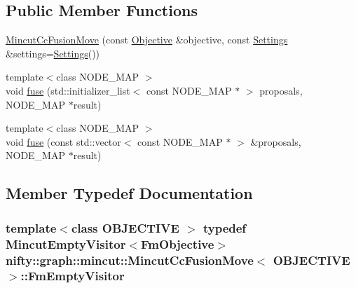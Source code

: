 \subsection*{Public Member Functions}
\begin{DoxyCompactItemize}
\item 
\hyperlink{classnifty_1_1graph_1_1mincut_1_1MincutCcFusionMove_ad81f95e0102565447947525e4cf6a1c0}{Mincut\+Cc\+Fusion\+Move} (const \hyperlink{classnifty_1_1graph_1_1mincut_1_1MincutCcFusionMove_a68c8abc0a1e335fb407edaff75a92896}{Objective} \&objective, const \hyperlink{structnifty_1_1graph_1_1mincut_1_1MincutCcFusionMove_1_1Settings}{Settings} \&settings=\hyperlink{structnifty_1_1graph_1_1mincut_1_1MincutCcFusionMove_1_1Settings}{Settings}())
\item 
{\footnotesize template$<$class N\+O\+D\+E\+\_\+\+M\+A\+P $>$ }\\void \hyperlink{classnifty_1_1graph_1_1mincut_1_1MincutCcFusionMove_ade7761d11b8265aa492115beeb169ab7}{fuse} (std\+::initializer\+\_\+list$<$ const N\+O\+D\+E\+\_\+\+M\+A\+P $\ast$ $>$ proposals, N\+O\+D\+E\+\_\+\+M\+A\+P $\ast$result)
\item 
{\footnotesize template$<$class N\+O\+D\+E\+\_\+\+M\+A\+P $>$ }\\void \hyperlink{classnifty_1_1graph_1_1mincut_1_1MincutCcFusionMove_a6ddaea6585b6e0e8224b505fce9434c1}{fuse} (const std\+::vector$<$ const N\+O\+D\+E\+\_\+\+M\+A\+P $\ast$ $>$ \&proposals, N\+O\+D\+E\+\_\+\+M\+A\+P $\ast$result)
\end{DoxyCompactItemize}


\subsection{Member Typedef Documentation}
\hypertarget{classnifty_1_1graph_1_1mincut_1_1MincutCcFusionMove_ab4667dee59d09f81cb8749d0eb89943e}{}
\subsubsection[{Fm\+Empty\+Visitor}]{\setlength{\rightskip}{0pt plus 5cm}template$<$class O\+B\+J\+E\+C\+T\+I\+V\+E $>$ typedef {\bf Mincut\+Empty\+Visitor}$<${\bf Fm\+Objective}$>$ {\bf nifty\+::graph\+::mincut\+::\+Mincut\+Cc\+Fusion\+Move}$<$ O\+B\+J\+E\+C\+T\+I\+V\+E $>$\+::{\bf Fm\+Empty\+Visitor}}\label{classnifty_1_1graph_1_1mincut_1_1MincutCcFusionMove_ab4667dee59d09f81cb8749d0eb89943e}
\hypertarget{classnifty_1_1graph_1_1mincut_1_1MincutCcFusionMove_a0c57954c08357717ac192ee1836f15b1}{}
